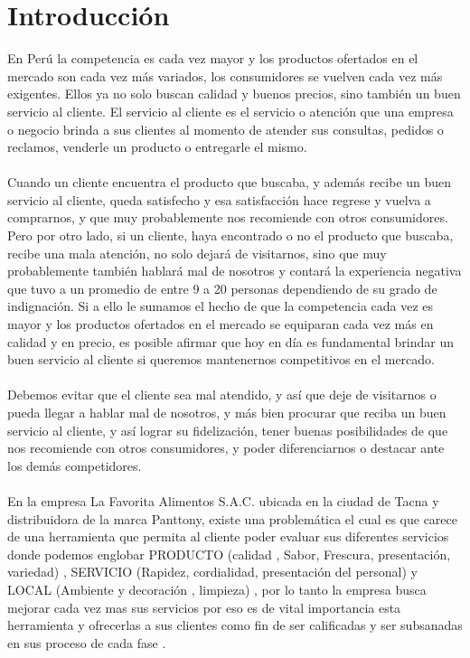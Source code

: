 \documentclass[preprint,12pt]{elsarticle}
\begin{document}
\section{Introducción}
En Perú la competencia es cada vez mayor y los productos ofertados en el mercado son cada vez más variados, los consumidores se vuelven cada vez más exigentes. Ellos ya no solo buscan calidad y buenos precios, sino también un buen servicio al cliente.
El servicio al cliente es el servicio o atención que una empresa o negocio brinda a sus clientes al momento de atender sus consultas, pedidos o reclamos, venderle un producto o entregarle el mismo.\\
\\Cuando un cliente encuentra el producto que buscaba, y además recibe un buen servicio al cliente, queda satisfecho y esa satisfacción hace regrese y vuelva a comprarnos, y que muy probablemente nos recomiende con otros consumidores.
Pero por otro lado, si un cliente, haya encontrado o no el producto que buscaba, recibe una mala atención, no solo dejará de visitarnos, sino que muy probablemente también hablará mal de nosotros y contará la experiencia negativa que tuvo a un promedio de entre 9 a 20 personas dependiendo de su grado de indignación.
Si a ello le sumamos el hecho de que la competencia cada vez es mayor y los productos ofertados en el mercado se equiparan cada vez más en calidad y en precio, es posible afirmar que hoy en día es fundamental brindar un buen servicio al cliente si queremos mantenernos competitivos en el mercado.\\
\\Debemos evitar que el cliente sea mal atendido, y así que deje de visitarnos o pueda llegar a hablar mal de nosotros, y más bien procurar que reciba un buen servicio al cliente, y así lograr su fidelización, tener buenas posibilidades de que nos recomiende con otros consumidores, y poder diferenciarnos o destacar ante los demás competidores.\\
\\En la empresa La Favorita Alimentos S.A.C. ubicada en la ciudad de Tacna y distribuidora de la marca Panttony, existe una problemática el cual es que carece de una herramienta que permita al cliente poder evaluar sus diferentes servicios donde podemos englobar PRODUCTO (calidad , Sabor, Frescura, presentación, variedad) , SERVICIO (Rapidez, cordialidad, presentación del personal) y LOCAL (Ambiente y decoración , limpieza) , por lo tanto la empresa busca mejorar cada vez mas sus servicios por eso es de vital importancia esta herramienta y ofrecerlas a sus clientes como fin de ser calificadas y ser subsanadas en sus proceso de cada fase .
\end{document}
